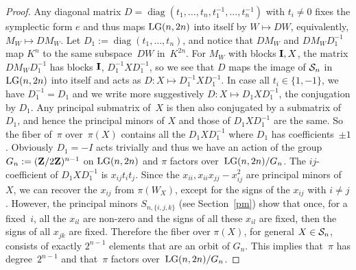 \documentclass[pdftex]{sigma}
\newcommand{\ZZ}{{\bf Z}}
\newcommand{\cS}{{\cal S}}
\numberwithin{equation}{section}
\begin{document}
\begin{proof} Any diagonal matrix $D=\operatorname{diag}(t_1,\ldots,t_n,t_1^{-1},\ldots,t_n^{-1})$ with $t_i\ne 0$ fixes the symplectic form $e$ and thus maps ${\rm LG}(n,2n)$ into itself by $W\mapsto DW$, equivalently, $M_W\mapsto DM_W$. Let $D_1:=\operatorname{diag}(t_1,\ldots,t_n)$, and notice that $DM_W$ and $DM_WD_1^{-1}$ map $K^n$ to the same subspace~$DW$ in~$K^{2n}$. For $M_W$ with blocks ${\bf I},X$, the matrix $DM_WD_1^{-1}$ has blocks ${\bf I}$, $D_1^{-1}XD_1^{-1}$, so we see that $D$ maps the image of $\cS_n$ in ${\rm LG}(n,2n)$ into itself and acts as $D\colon X\mapsto D_1^{-1}XD_1^{-1}$. In case all $t_i\in\{1,-1\}$, we have $D_1^{-1}=D_1$ and we write more suggestively $D\colon X\mapsto D_1XD_1^{-1}$, the conjugation by $D_1$. Any principal submatrix of~$X$ is then also conjugated by a submatrix of~$D_1$, and hence the principal minors of $X$ and those of $D_1XD_1^{-1}$ are the same. So the fiber of~$\pi$ over~$\pi(X)$ contains all the $D_1XD_1^{-1}$ where $D_1$ has coefficients~$\pm 1$. Obviously $D_1=-I$ acts trivially and thus we have an action of the group $G_n:=(\ZZ/2\ZZ)^{n-1}$ on ${\rm LG}(n,2n)$ and $\pi$ factors over~${\rm LG}(n,2n)/G_n$. The $ij$-coefficient of $D_1XD_1^{-1}$ is $x_{ij}t_it_j$. Since the $x_{ii},x_{ii}x_{jj}-x_{ij}^2$ are principal minors of $X$, we can recover the $x_{ij}$ from $\pi(W_X)$, except for the signs of the $x_{ij}$ with $i\ne j$. However, the principal minors $S_{n,\{i,j,k\}}$ (see Section~\ref{pm}) show that once, for a fixed~$i$, all the $x_{il}$ are non-zero and the signs of all these $x_{il}$ are fixed, then the signs of all $x_{jk}$ are fixed. Therefore the fiber over $\pi(X)$, for general $X\in \cS_n$, consists of exactly $2^{n-1}$ elements that are an orbit of $G_n$. This implies that~$\pi$ has degree~$2^{n-1}$ and that~$\pi$ factors over~${\rm LG}(n,2n)/G_n$.
\end{proof}
\end{document}
